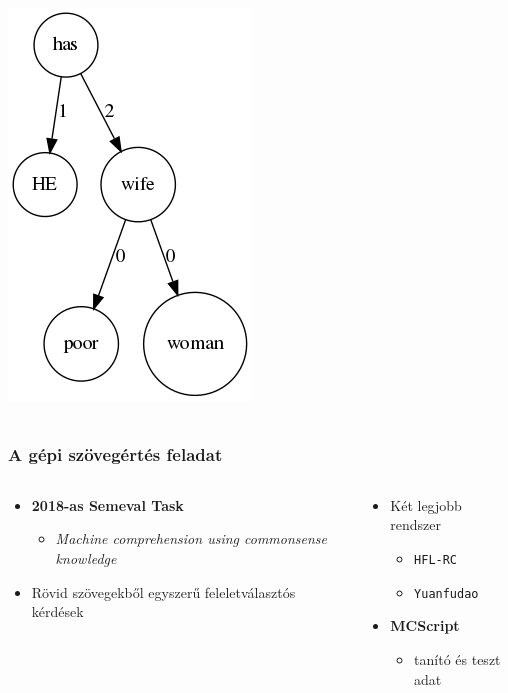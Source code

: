 \documentclass[bigger]{beamer}
\begin{document}
\begin{frame}
\begin{columns}
\begin{column}{0.3\textwidth}
	\pause \includegraphics[scale=0.4]{pics/wifeexp.png}
	\end{column}
\end{columns}
\end{frame}

\begin{frame}
	\frametitle{A gépi szövegértés feladat \citep{Chen:2018, Wang:2018}}
	\begin{columns}
		\begin{column}{0.6\textwidth}
			\begin{itemize}
				\pause \item \textbf{2018-as Semeval Task}
				\begin{itemize}
					\item \textit{Machine comprehension using commonsense knowledge}
				\end{itemize}
				\pause \item Rövid szövegekből egyszerű feleletválasztós kérdések
			\end{itemize}
		\end{column}
		\begin{column}{0.5\textwidth}
			\begin{itemize}
			\pause \item Két legjobb rendszer
			\begin{itemize}
				\item \texttt{HFL-RC}
				\item \texttt{Yuanfudao}
			\end{itemize}
			\pause \item \textbf{MCScript}
			\begin{itemize}
				\item tanító és teszt adat
			\end{itemize}
		\end{itemize}
		\end{column}
	\end{columns}
	
	\end{frame}
\end{document}
